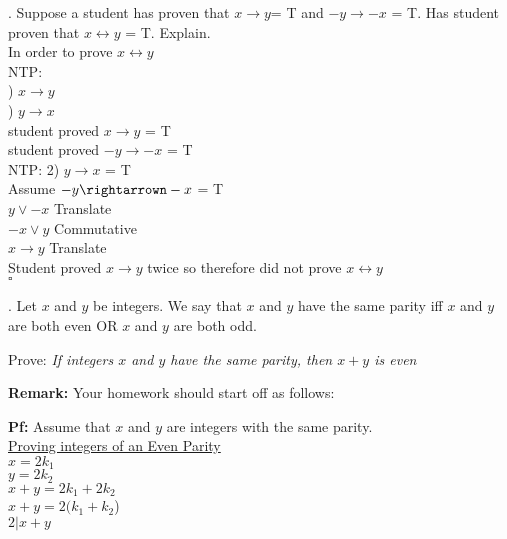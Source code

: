 \documentclass[12pt]{article}
\begin{document}
.  Suppose a student has proven that $x \rightarrow y $= T and $-y \rightarrow -x$ = T.  Has student proven that $x \leftrightarrow y$ = T. Explain.  \\ 
In order to prove $x \leftrightarrow y$ \\
\indent NTP: \\
\indent {}) $x \rightarrow y$ \\
\indent {}) $y \rightarrow x$\\

\indent student proved $x \rightarrow y$ = T \\ 
\indent student proved $-y \rightarrow -x$ = T \\ 

\indent NTP: 2) $y \rightarrow x$ = T \\ 

\indent Assume $ -y \rightarrown -x $ = T \\
\indent $y \vee -x$ \;\; \mbox Translate \\
\indent $-x \vee y$ \;\; \mbox Commutative \\
\indent $x \rightarrow y$ \mbox Translate \\
\indent Student proved $x \rightarrow y$ twice so therefore did not prove $x \leftrightarrow y$ \\
$\square$


 

\vspace{.15in}
.  Let $x$ and $y$ be integers.  We say that $x$ and $y$ have the same parity iff $x$ and $y$ are both even OR $x$ and $y$ are both odd.  
\vspace{.05in}

\noindent Prove: \textit{ If integers $x$ and $y$ have the same parity, then $x + y$ is even}
\vspace{.05in}

\noindent \textbf{Remark:} Your homework should start off as follows:
\vspace{.05in}

\noindent \textbf{Pf:}  Assume that $x$ and $y$ are integers with the same parity.  \\

\underline {Proving integers of an Even Parity} \\ 

\indent $x = 2k_1$ \\ 
\indent $y = 2k_2$ \\ 
\indent $x + y = 2k_1 + 2k_2$ \\
\indent $x + y = 2(k_1 +k_2$) \\
\indent $2 | x + y$ \\
\end{document}
